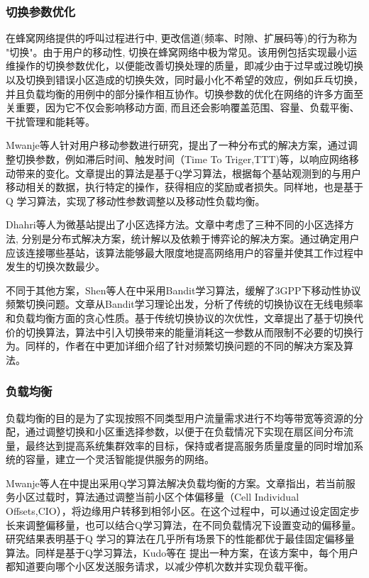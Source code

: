 ﻿\documentclass[11pt,draftclsnofoot,onecolumn,journal,letterpaper]{IEEEtran}
\begin{document}
\subsubsection{切换参数优化}
在蜂窝网络提供的呼叫过程进行中, 更改信道(频率、时隙、扩展码等)的行为称为 "切换"。由于用户的移动性, 切换在蜂窝网络中极为常见。该用例包括实现最小运维操作的切换参数优化，以便能改善切换处理的质量，即减少由于过早或过晚切换以及切换到错误小区造成的切换失效，同时最小化不希望的效应，例如乒乓切换，并且负载均衡的用例中的部分操作相互协作。切换参数的优化在网络的许多方面至关重要，因为它不仅会影响移动方面, 而且还会影响覆盖范围、容量、负载平衡、干扰管理和能耗等。


Mwanje等人\cite{Mwanje2014}针对用户移动参数进行研究，提出了一种分布式的解决方案，通过调整切换参数，例如滞后时间、触发时间（Time To Triger,TTT)等，以响应网络移动带来的变化。文章提出的算法是基于Q学习算法，根据每个基站观测到的与用户移动相关的数据，执行特定的操作，获得相应的奖励或者损失。同样地，\cite{Mwanje2013}也是基于Q 学习算法，实现了移动性参数调整以及移动性负载均衡。

Dhahri等人\cite{Dhahri2014}为微基站提出了小区选择方法。文章中考虑了三种不同的小区选择方法, 分别是分布式解决方案，统计解以及依赖于博弈论的解决方案。通过确定用户应该连接哪些基站，该算法能够最大限度地提高网络用户的容量并使其工作过程中发生的切换次数最少。

不同于其他方案，Shen等人在\cite{Shen2017}中采用Bandit学习算法，缓解了3GPP下移动性协议频繁切换问题。文章从Bandit学习理论出发，分析了传统的切换协议在无线电频率和负载均衡方面的贪心性质。基于传统切换协议的次优性，文章提出了基于切换代价的切换算法，算法中引入切换带来的能量消耗这一参数从而限制不必要的切换行为。同样的，作者在\cite{Shen2016}中更加详细介绍了针对频繁切换问题的不同的解决方案及算法。

\subsubsection{负载均衡}

负载均衡的目的是为了实现按照不同类型用户流量需求进行不均等带宽等资源的分配，通过调整切换和小区重选择参数，以便于在负载情况下实现在扇区间分布流量，最终达到提高系统集群效率的目标，保持或者提高服务质量度量的同时增加系统的容量，建立一个灵活智能提供服务的网络。


Mwanje等人在\cite{Mwanje2013}中提出采用Q学习算法解决负载均衡的方案。文章指出，若当前服务小区过载时，算法通过调整当前小区个体偏移量（Cell Individual Offsets,CIO），将边缘用户转移到相邻小区。在这个过程中，可以通过设定固定步长来调整偏移量，也可以结合Q学习算法，在不同负载情况下设置变动的偏移量。研究结果表明基于Q 学习的算法在几乎所有场景下的性能都优于最佳固定偏移量算法。同样是基于Q学习算法，Kudo等在\cite{Kudo2014} 提出一种方案，在该方案中，每个用户都知道要向哪个小区发送服务请求，以减少停机次数并实现负载平衡。
\end{document}
